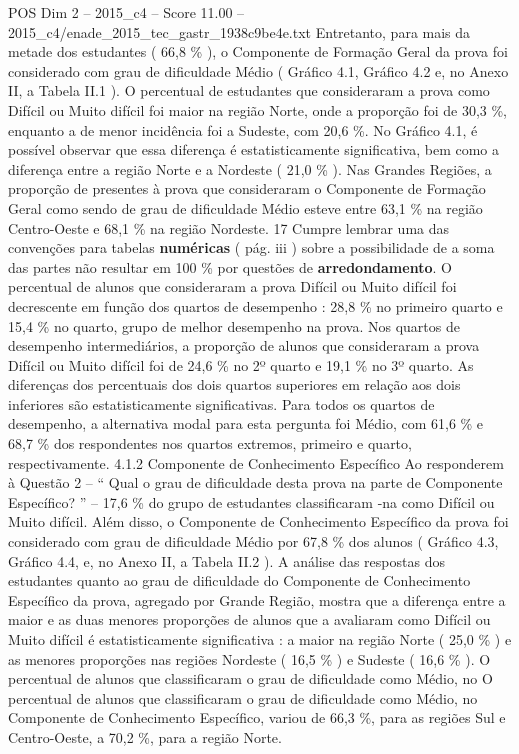 \begin{textsample}{POS Dim 2 – 2015\_c4 – Score 11.00 – 2015\_c4/enade\_2015\_tec\_gastr\_1938c9be4e.txt}
Entretanto, para mais da metade dos estudantes ( 66,8 \% ), o Componente de Formação Geral da prova foi considerado com grau de dificuldade Médio ( Gráfico 4.1, Gráfico 4.2 e, no Anexo II, a Tabela II.1 ).
O percentual de estudantes que consideraram a prova como Difícil ou Muito difícil foi maior na região Norte, onde a proporção foi de 30,3 \%, enquanto a de menor incidência foi a Sudeste, com 20,6 \%.
No Gráfico 4.1, é possível observar que essa diferença é estatisticamente significativa, bem como a diferença entre a região Norte e a Nordeste ( 21,0 \% ).
Nas Grandes Regiões, a proporção de presentes à prova que consideraram o Componente de Formação Geral como sendo de grau de dificuldade Médio esteve entre 63,1 \% na região Centro-Oeste e 68,1 \% na região Nordeste. 17 Cumpre lembrar uma das convenções para tabelas \textbf{numéricas} ( pág. iii ) sobre a possibilidade de a soma das partes não resultar em 100 \% por questões de \textbf{arredondamento}.
O percentual de alunos que consideraram a prova Difícil ou Muito difícil foi decrescente em função dos quartos de desempenho : 28,8 \% no primeiro quarto e 15,4 \% no quarto, grupo de melhor desempenho na prova.
Nos quartos de desempenho intermediários, a proporção de alunos que consideraram a prova Difícil ou Muito difícil foi de 24,6 \% no 2º quarto e 19,1 \% no 3º quarto.
As diferenças dos percentuais dos dois quartos superiores em relação aos dois inferiores são estatisticamente significativas.
Para todos os quartos de desempenho, a alternativa modal para esta pergunta foi Médio, com 61,6 \% e 68,7 \% dos respondentes nos quartos extremos, primeiro e quarto, respectivamente. 4.1.2 Componente de Conhecimento Específico Ao responderem à Questão 2 – “ Qual o grau de dificuldade desta prova na parte de Componente Específico? ” – 17,6 \% do grupo de estudantes classificaram -na como Difícil ou Muito difícil.
Além disso, o Componente de Conhecimento Específico da prova foi considerado com grau de dificuldade Médio por 67,8 \% dos alunos ( Gráfico 4.3, Gráfico 4.4, e, no Anexo II, a Tabela II.2 ).
A análise das respostas dos estudantes quanto ao grau de dificuldade do Componente de Conhecimento Específico da prova, agregado por Grande Região, mostra que a diferença entre a maior e as duas menores proporções de alunos que a avaliaram como Difícil ou Muito difícil é estatisticamente significativa : a maior na região Norte ( 25,0 \% ) e as menores proporções nas regiões Nordeste ( 16,5 \% ) e Sudeste ( 16,6 \% ).
O percentual de alunos que classificaram o grau de dificuldade como Médio, no O percentual de alunos que classificaram o grau de dificuldade como Médio, no Componente de Conhecimento Específico, variou de 66,3 \%, para as regiões Sul e Centro-Oeste, a 70,2 \%, para a região Norte.

\end{textsample}
